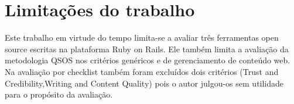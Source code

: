 \section{Limitações do trabalho}

Este trabalho em virtude do tempo limita-se a avaliar três ferramentas open source escritas na plataforma Ruby on Rails. Ele também limita a avaliação da metodologia QSOS  nos critérios genéricos e de gerenciamento de conteúdo web. Na avaliação por checklist também foram excluídos dois critérios (Trust and Credibility,Writing and Content Quality) pois o autor julgou-os sem utilidade para o propósito da avaliação.
